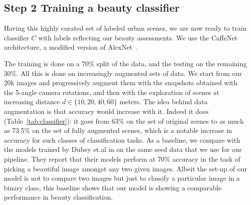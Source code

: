 \subsection*{Step 2 Training a beauty classifier}
\label{Sec:Classifier}
Having this highly curated set of labeled urban scenes, we are now ready to train classifier $C$ with labels reflecting our beauty assessments. We use the CaffeNet architecture, a modified version of AlexNet~\cite{krizhevsky2012imagenet,szegedy2015going}. 

The training is done on a 70\% split of the data, and the testing on the remaining 30\%. All this is done on increasingly augmented sets of data. We start from our 20k images and progressively augment them with  the snapshots obtained with the 5-angle camera rotations, and then with the exploration of scenes at increasing distance $d \in \{10,20,40,60\}$ meters. The idea behind data augmentation is that accuracy would increase with it. Indeed it does (Table~\ref{tab:classifier}): it goes from 63\% on the set of original scenes to as much as 73.5\% on the set of fully augmented scenes, which is a notable increase in accuracy for such classes of classification tasks. As a baseline, we compare with the models trained by Dubey et.al in \cite{dubey2016deep} on the same seed data that we use for our pipeline. They report that their models perform at 70\% accuracy in the task of picking a beautiful image amongst any two given images. Albeit the set-up of our model is not to compare two images but just to classify a particular image in a binary class, this baseline shows that our model is showing a comparable performance in beauty classification. 



